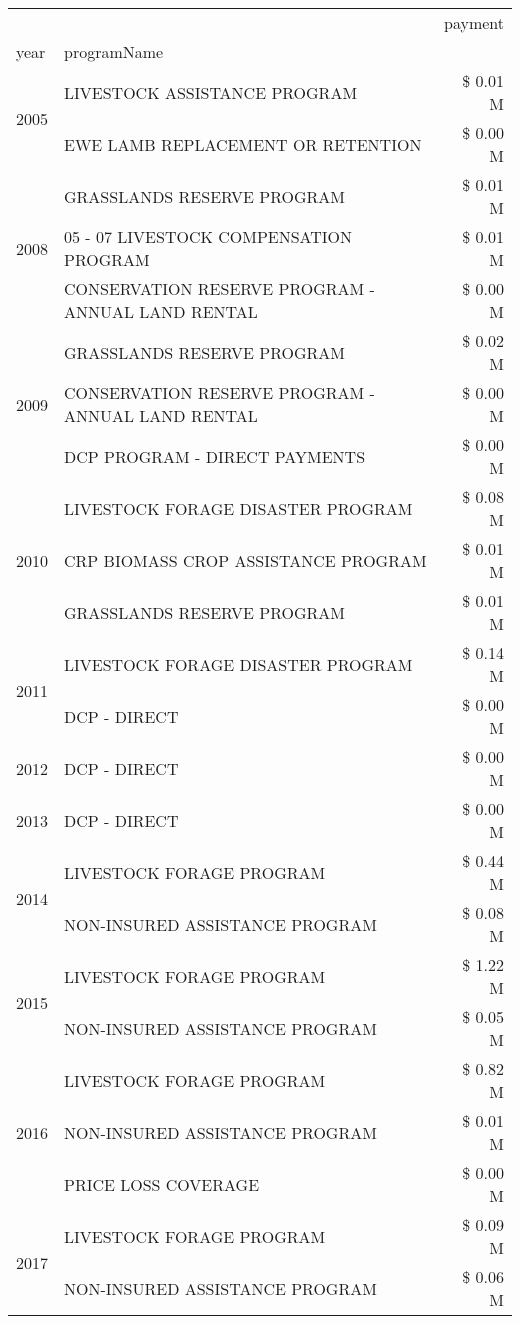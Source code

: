 \begin{tabular}{llr}
\toprule
 &  & payment \\
year & programName &  \\
\midrule
\multirow[t]{2}{*}{2005} & LIVESTOCK ASSISTANCE PROGRAM & \$ 0.01 M \\
 & EWE LAMB REPLACEMENT OR RETENTION & \$ 0.00 M \\
\cline{1-3}
\multirow[t]{3}{*}{2008} & GRASSLANDS RESERVE PROGRAM & \$ 0.01 M \\
 & 05 - 07 LIVESTOCK COMPENSATION PROGRAM & \$ 0.01 M \\
 & CONSERVATION RESERVE PROGRAM - ANNUAL LAND RENTAL & \$ 0.00 M \\
\cline{1-3}
\multirow[t]{3}{*}{2009} & GRASSLANDS RESERVE PROGRAM & \$ 0.02 M \\
 & CONSERVATION RESERVE PROGRAM - ANNUAL LAND RENTAL & \$ 0.00 M \\
 & DCP PROGRAM - DIRECT PAYMENTS & \$ 0.00 M \\
\cline{1-3}
\multirow[t]{3}{*}{2010} & LIVESTOCK FORAGE DISASTER PROGRAM & \$ 0.08 M \\
 & CRP BIOMASS CROP ASSISTANCE PROGRAM & \$ 0.01 M \\
 & GRASSLANDS RESERVE PROGRAM & \$ 0.01 M \\
\cline{1-3}
\multirow[t]{2}{*}{2011} & LIVESTOCK FORAGE DISASTER PROGRAM & \$ 0.14 M \\
 & DCP - DIRECT & \$ 0.00 M \\
\cline{1-3}
2012 & DCP - DIRECT & \$ 0.00 M \\
\cline{1-3}
2013 & DCP - DIRECT & \$ 0.00 M \\
\cline{1-3}
\multirow[t]{2}{*}{2014} & LIVESTOCK FORAGE PROGRAM & \$ 0.44 M \\
 & NON-INSURED ASSISTANCE PROGRAM & \$ 0.08 M \\
\cline{1-3}
\multirow[t]{2}{*}{2015} & LIVESTOCK FORAGE PROGRAM & \$ 1.22 M \\
 & NON-INSURED ASSISTANCE PROGRAM & \$ 0.05 M \\
\cline{1-3}
\multirow[t]{3}{*}{2016} & LIVESTOCK FORAGE PROGRAM & \$ 0.82 M \\
 & NON-INSURED ASSISTANCE PROGRAM & \$ 0.01 M \\
 & PRICE LOSS COVERAGE & \$ 0.00 M \\
\cline{1-3}
\multirow[t]{3}{*}{2017} & LIVESTOCK FORAGE PROGRAM & \$ 0.09 M \\
 & NON-INSURED ASSISTANCE PROGRAM & \$ 0.06 M \\

\end{tabular}
